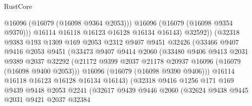 \begin{lexlean}{RustCore}
\begin{coremodule}
                                @16096
                                (@16079 (@16098 @9364 @2053)))
                              @16096
                              (@16079 (@16098 @9354 @9370)))
                            @16114
                            @16118
                            @16123
                            @16128
                            @16134
                            @16143)
                          @32592))
                      (@32318
                        @9383
                        @193
                        @1309
                        @169
                        @2053
                        @2312
                        @9407
                        @9451
                        @32426
                        (@33466
                          @9407
                          @9416
                          @2053
                          @9451
                          (@33473
                            @9407
                            @9414
                            @2060
                            (@33480
                              @9406
                              @9413
                              @2031
                              @9389
                              @2037
                              @32292
                              (@21172
                                @9399
                                @2037
                                @21178
                                @20937
                                @16096
                                (@16079 (@16098 @9400 @2053)))
                              @16096
                              (@16079 (@16098 @9390 @9406)))
                            @16114
                            @16118
                            @16123
                            @16128
                            @16134
                            @16143)
                          (@32318
                            @9416
                            @1256
                            @171
                            @169
                            @9439
                            @9448
                            @2053
                            @2241
                            (@32617
                              @9439
                              @9446
                              @2060
                              (@32624
                                @9438
                                @9445
                                @2031
                                @9421
                                @2037
                                @32384

\end{coremodule}
\end{lexlean}

